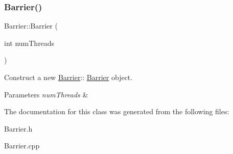 \subsubsection{\texorpdfstring{Barrier()}{Barrier()}}
{\footnotesize\ttfamily Barrier\+::\+Barrier (\begin{DoxyParamCaption}\item[{int}]{num\+Threads }\end{DoxyParamCaption})}



Construct a new \hyperlink{classBarrier}{Barrier}\+:\+: \hyperlink{classBarrier}{Barrier} object. 


\begin{DoxyParams}{Parameters}
{\em num\+Threads} & \\
\hline
\end{DoxyParams}


The documentation for this class was generated from the following files\+:\begin{DoxyCompactItemize}
\item 
Barrier.\+h\item 
Barrier.\+cpp\end{DoxyCompactItemize}
